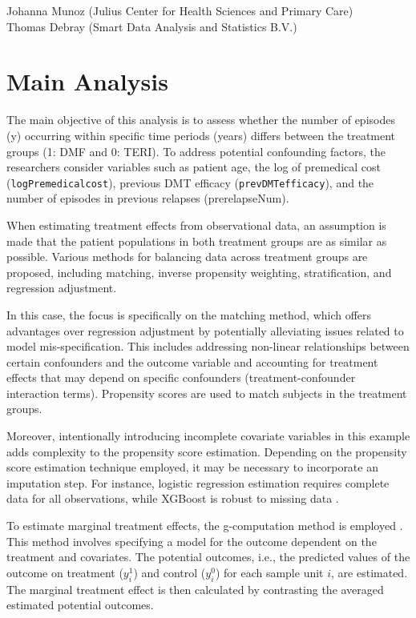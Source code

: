 \documentclass[
  letterpaper,
  DIV=11,
  numbers=noendperiod]{scrreprt}
\begin{document}
Johanna Munoz (Julius Center for Health Sciences and Primary Care)\\
Thomas Debray (Smart Data Analysis and Statistics B.V.)

\hfill\break

\hypertarget{main-analysis}{%
\section{Main Analysis}\label{main-analysis}}

The main objective of this analysis is to assess whether the number of
episodes (y) occurring within specific time periods (years) differs
between the treatment groups (1: DMF and 0: TERI). To address potential
confounding factors, the researchers consider variables such as patient
age, the log of premedical cost (\texttt{logPremedicalcost}), previous
DMT efficacy (\texttt{prevDMTefficacy}), and the number of episodes in
previous relapses (prerelapseNum).

When estimating treatment effects from observational data, an assumption
is made that the patient populations in both treatment groups are as
similar as possible. Various methods for balancing data across treatment
groups are proposed, including matching, inverse propensity weighting,
stratification, and regression adjustment.

In this case, the focus is specifically on the matching method, which
offers advantages over regression adjustment by potentially alleviating
issues related to model mis-specification. This includes addressing
non-linear relationships between certain confounders and the outcome
variable and accounting for treatment effects that may depend on
specific confounders (treatment-confounder interaction terms).
Propensity scores are used to match subjects in the treatment groups.

Moreover, intentionally introducing incomplete covariate variables in
this example adds complexity to the propensity score estimation.
Depending on the propensity score estimation technique employed, it may
be necessary to incorporate an imputation step. For instance, logistic
regression estimation requires complete data for all observations, while
XGBoost is robust to missing data \cite{zhao_propensity_2021}.

To estimate marginal treatment effects, the g-computation method is
employed \cite{snowden_implementation_2011}. This method involves
specifying a model for the outcome dependent on the treatment and
covariates. The potential outcomes, i.e., the predicted values of the
outcome on treatment (\(y_i^1\)) and control (\(y_i^0\)) for each sample
unit \(i\), are estimated. The marginal treatment effect is then
calculated by contrasting the averaged estimated potential outcomes.
\end{document}
